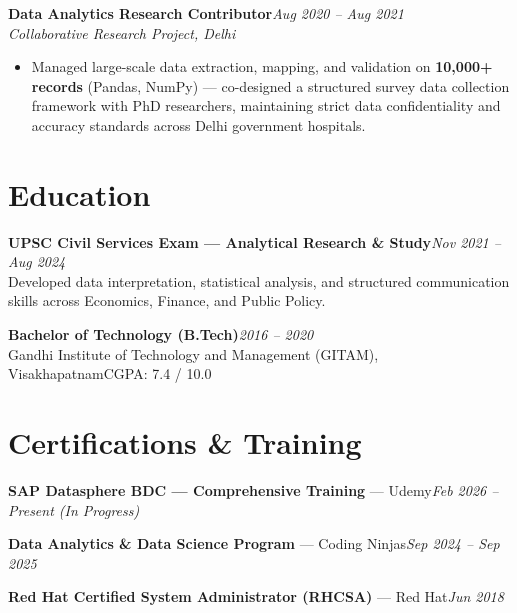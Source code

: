 \documentclass[10pt, letterpaper]{article}
\newcommand{\role}[3]{%
  \vspace{2pt}%
  {\bfseries #1}\hfill{\small\color{muted}\textit{#3}}\\[-2pt]%
  {\small\color{muted}\textit{#2}}%
}
\begin{document}
\role{Data Analytics Research Contributor}{Collaborative Research Project, Delhi}{Aug 2020 – Aug 2021}

\begin{itemize}
  \item Managed large-scale data extraction, mapping, and validation on \textbf{10,000+ records} (Pandas, NumPy) — co-designed a structured survey data collection framework with PhD researchers, maintaining strict data confidentiality and accuracy standards across Delhi government hospitals.
\end{itemize}


\section{Education}

{\bfseries UPSC Civil Services Exam — Analytical Research \& Study}\hfill{\small\color{muted}\textit{Nov 2021 – Aug 2024}}\\
{\small\color{muted}Developed data interpretation, statistical analysis, and structured communication skills across Economics, Finance, and Public Policy.}

\vspace{2pt}
{\bfseries Bachelor of Technology (B.Tech)}\hfill{\small\color{muted}\textit{2016 – 2020}}\\
{\small\color{muted}Gandhi Institute of Technology and Management (GITAM), Visakhapatnam\hfill CGPA: 7.4 / 10.0}

\section{Certifications \& Training}

{\bfseries SAP Datasphere BDC — Comprehensive Training} — Udemy\hfill{\small\color{muted}\textit{Feb 2026 – Present \emph{(In Progress)}}}

\vspace{1pt}
{\bfseries Data Analytics \& Data Science Program} — Coding Ninjas\hfill{\small\color{muted}\textit{Sep 2024 – Sep 2025}}

\vspace{1pt}
{\bfseries Red Hat Certified System Administrator (RHCSA)} — Red Hat\hfill{\small\color{muted}\textit{Jun 2018}}

\end{document}
